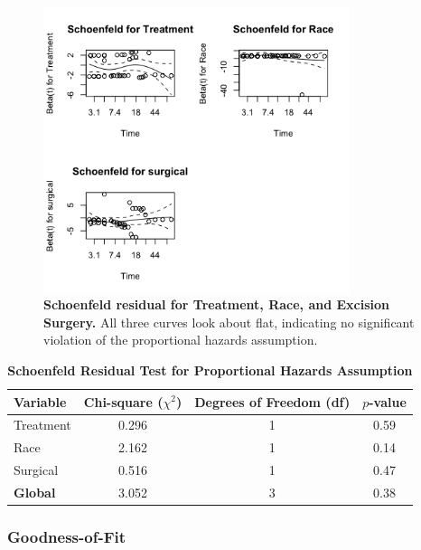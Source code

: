 \documentclass[12pt]{article}
\begin{document}
\begin{figure}[H]
    \centering
    \includegraphics[width=0.8\textwidth]{plots/schoenfeld.png}
    \caption{\textbf{Schoenfeld residual for Treatment, Race, and Excision Surgery. } All three curves look about flat, indicating no significant violation of the proportional hazards assumption. }
    \label{fig:km_na_curves}
\end{figure}

\begin{table}[H]
\centering
\caption{\textbf{Schoenfeld Residual Test for Proportional Hazards Assumption}}
\label{tab:cox_zph}
\begin{tabular}{lccc}
\toprule
Variable   & Chi-square (\( \chi^2 \)) & Degrees of Freedom (df) & \( p \)-value \\
\midrule
Treatment  & 0.296                     & 1                       & 0.59          \\
Race       & 2.162                     & 1                       & 0.14          \\
Surgical   & 0.516                     & 1                       & 0.47          \\
\textbf{Global} & 3.052                     & 3                       & 0.38          \\
\bottomrule
\end{tabular}
\end{table}


\subsubsection*{Goodness-of-Fit}
\end{document}
